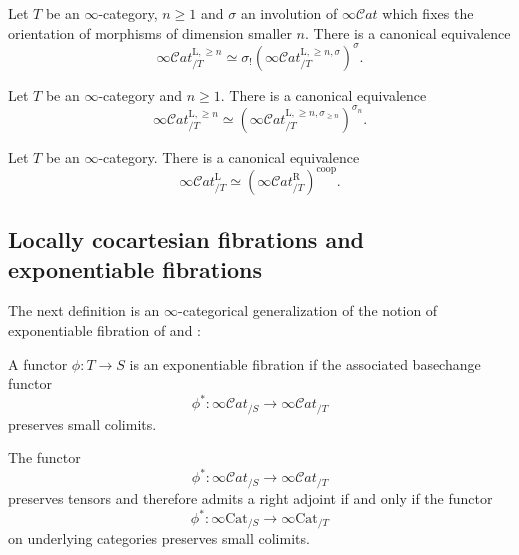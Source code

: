 \documentclass[10pt,oneside]{article}
\numberwithin{equation}{section} %
\numberwithin{figure}{section} %
\theoremstyle{plain}
\theoremstyle{definition}
\newcommand{\Cat}{\mathrm{Cat}}
\newcommand{\coop}{\mathrm{coop}}
\newcommand{\scat}{\mathcal{C}\mathit{at}}
\begin{document}
\begin{corollary}\label{Grobica2}Let $T$ be an $\infty$-category, $ n \geq 1$ and $\sigma$ an involution of $\infty\scat$
which fixes the orientation of morphisms of dimension smaller $n.$
There is a canonical equivalence $$\infty\scat^{\mathrm{L},\geq n}_{/T} \simeq \sigma_!(\infty\scat^{\mathrm{L},\geq n, \sigma}_{/T})^\sigma .$$

\end{corollary}

\begin{corollary}\label{Grobica2}Let $T$ be an $\infty$-category and $ n \geq 1$.
There is a canonical equivalence $$\infty\scat^{\mathrm{L},\geq n}_{/T} \simeq (\infty\scat^{\mathrm{L},\geq n, \sigma_{\geq n}}_{/T})^{\sigma_n} .$$

\end{corollary}

\begin{corollary}\label{leftrightadj}
Let $T$ be an $\infty$-category.
There is a canonical equivalence
$$ \infty\scat_{/T}^{\mathrm{L}} \simeq (\infty\scat_{/T}^{\mathrm{R}})^\coop.$$

\end{corollary}


\subsection{Locally cocartesian fibrations and exponentiable fibrations}

The next definition is an $\infty$-categorical generalization of
the notion of exponentiable fibration of \cite[Definition 3.21.]{heine2026local} and \cite[Definition B.3.1.]{lurie.higheralgebra}:

\begin{definition}

A functor $\phi:T\to S$ is an exponentiable fibration if the associated basechange functor $$\phi^*:\infty\scat_{/S}\to\infty\scat_{/T}$$ preserves small colimits.
    
\end{definition}

\begin{remark}

The functor $$\phi^*:\infty\scat_{/S}\to\infty\scat_{/T}$$ preserves tensors and therefore admits a right adjoint if and only if the functor 
$$\phi^*:\infty\Cat_{/S}\to\infty\Cat_{/T}$$ on underlying categories
preserves small colimits.
    
\end{remark}
\end{document}
